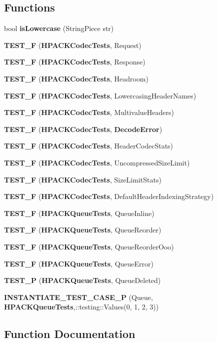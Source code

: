 \subsection*{Functions}
\begin{DoxyCompactItemize}
\item 
bool {\bf is\+Lowercase} (String\+Piece str)
\item 
{\bf T\+E\+S\+T\+\_\+F} ({\bf H\+P\+A\+C\+K\+Codec\+Tests}, Request)
\item 
{\bf T\+E\+S\+T\+\_\+F} ({\bf H\+P\+A\+C\+K\+Codec\+Tests}, Response)
\item 
{\bf T\+E\+S\+T\+\_\+F} ({\bf H\+P\+A\+C\+K\+Codec\+Tests}, Headroom)
\item 
{\bf T\+E\+S\+T\+\_\+F} ({\bf H\+P\+A\+C\+K\+Codec\+Tests}, Lowercasing\+Header\+Names)
\item 
{\bf T\+E\+S\+T\+\_\+F} ({\bf H\+P\+A\+C\+K\+Codec\+Tests}, Multivalue\+Headers)
\item 
{\bf T\+E\+S\+T\+\_\+F} ({\bf H\+P\+A\+C\+K\+Codec\+Tests}, {\bf Decode\+Error})
\item 
{\bf T\+E\+S\+T\+\_\+F} ({\bf H\+P\+A\+C\+K\+Codec\+Tests}, Header\+Codec\+Stats)
\item 
{\bf T\+E\+S\+T\+\_\+F} ({\bf H\+P\+A\+C\+K\+Codec\+Tests}, Uncompressed\+Size\+Limit)
\item 
{\bf T\+E\+S\+T\+\_\+F} ({\bf H\+P\+A\+C\+K\+Codec\+Tests}, Size\+Limit\+Stats)
\item 
{\bf T\+E\+S\+T\+\_\+F} ({\bf H\+P\+A\+C\+K\+Codec\+Tests}, Default\+Header\+Indexing\+Strategy)
\item 
{\bf T\+E\+S\+T\+\_\+F} ({\bf H\+P\+A\+C\+K\+Queue\+Tests}, Queue\+Inline)
\item 
{\bf T\+E\+S\+T\+\_\+F} ({\bf H\+P\+A\+C\+K\+Queue\+Tests}, Queue\+Reorder)
\item 
{\bf T\+E\+S\+T\+\_\+F} ({\bf H\+P\+A\+C\+K\+Queue\+Tests}, Queue\+Reorder\+Ooo)
\item 
{\bf T\+E\+S\+T\+\_\+F} ({\bf H\+P\+A\+C\+K\+Queue\+Tests}, Queue\+Error)
\item 
{\bf T\+E\+S\+T\+\_\+P} ({\bf H\+P\+A\+C\+K\+Queue\+Tests}, Queue\+Deleted)
\item 
{\bf I\+N\+S\+T\+A\+N\+T\+I\+A\+T\+E\+\_\+\+T\+E\+S\+T\+\_\+\+C\+A\+S\+E\+\_\+P} (Queue, {\bf H\+P\+A\+C\+K\+Queue\+Tests},\+::testing\+::\+Values(0, 1, 2, 3))
\end{DoxyCompactItemize}


\subsection{Function Documentation}
